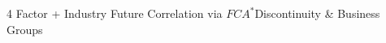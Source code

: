 \documentclass{beamer}
\begin{document}
	

	
	
%			
%			
%			
%	
	
	
	
	
	

		
		\begin{frame}{ 4 Factor + Industry Future  Correlation via $ FCA^* $}{Discontinuity \&  Business Groups}\label{Monthly19}
		
		
		
		
		

\end{frame}
\end{document}
